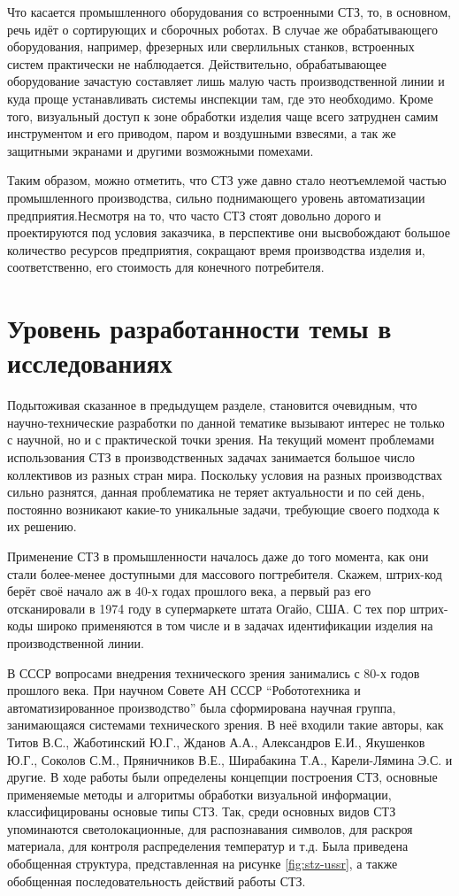 Что касается промышленного оборудования со встроенными СТЗ, то, в основном, речь идёт о сортирующих и сборочных роботах. В случае же обрабатывающего оборудования, например, фрезерных или сверлильных станков, встроенных систем практически не наблюдается. Действительно, обрабатывающее оборудование зачастую составляет лишь малую часть производственной линии и куда проще устанавливать системы инспекции там, где это необходимо. Кроме того, визуальный доступ к зоне обработки изделия чаще всего затруднен самим инструментом и его приводом, паром и воздушными взвесями, а так же защитными экранами и другими возможными помехами.

Таким образом, можно отметить, что СТЗ уже давно стало неотъемлемой частью промышленного производства, сильно поднимающего уровень автоматизации предприятия.Несмотря на то, что часто СТЗ стоят довольно дорого и проектируются под условия заказчика, в перспективе они высвобождают большое количество ресурсов предприятия, сокращают время производства изделия и, соответственно, его стоимость для конечного потребителя.

\section{Уровень разработанности темы в исследованиях} \label{sect1_3}

Подытоживая сказанное в предыдущем разделе, становится очевидным, что научно-технические разработки по данной тематике вызывают интерес не только с научной, но и с практической точки зрения. На текущий момент проблемами использования СТЗ в производственных задачах занимается большое число коллективов из разных стран мира. Поскольку условия на разных производствах сильно разнятся, данная проблематика не теряет актуальности и по сей день, постоянно возникают какие-то уникальные задачи, требующие своего подхода к их решению.

Применение СТЗ в промышленности началось даже до того момента, как они стали более-менее доступными для массового погтребителя. Скажем, штрих-код берёт своё начало аж в 40-х годах прошлого века, а первый раз его отсканировали в 1974 году в супермаркете штата Огайо, США. С тех пор штрих-коды широко применяются в том числе и в задачах идентификации изделия на производственной линии.

В СССР вопросами внедрения технического зрения занимались с 80-х годов прошлого века. При научном Совете АН СССР ``Робототехника и автоматизированное производство'' была сформирована научная группа, занимающаяся системами технического зрения. В неё входили такие авторы, как Титов В.С., Жаботинский Ю.Г., Жданов А.А., Александров Е.И., Якушенков Ю.Г., Соколов С.М., Пряничников В.Е., Ширабакина Т.А., Карели-Лямина Э.С. и другие. В ходе работы были определены концепции построения СТЗ, основные применяемые методы и алгоритмы обработки визуальной информации, классифицированы основые типы СТЗ. Так, среди основных видов СТЗ упоминаются светолокационные, для распознавания символов, для раскроя материала, для контроля распределения температур и т.д. Была приведена обобщенная структура, представленная на рисунке \cref{fig:stz-ussr}, а также обобщенная последовательность действий работы СТЗ.

